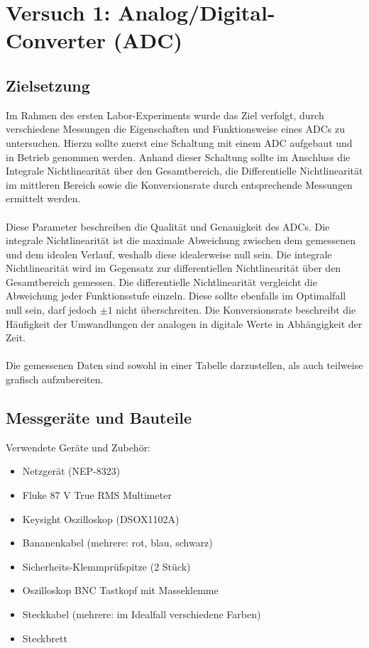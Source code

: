 \documentclass[a4paper,12pt]{article}
\begin{document}
\section{Versuch 1: Analog/Digital-Converter (ADC)}

\subsection{Zielsetzung}
Im Rahmen des ersten Labor-Experiments wurde das Ziel verfolgt, durch verschiedene Messungen die Eigenschaften und Funktionsweise eines ADCs zu untersuchen. Hierzu sollte zuerst eine Schaltung mit einem ADC aufgebaut und in Betrieb genommen werden. Anhand dieser Schaltung sollte im Anschluss die Integrale Nichtlinearität über den Gesamtbereich, die Differentielle Nichtlinearität im mittleren Bereich sowie die Konversionsrate durch entsprechende Messungen ermittelt werden.\\\\Diese Parameter beschreiben die Qualität und Genauigkeit des ADCs. Die integrale Nichtlinearität ist die maximale Abweichung zwischen dem gemessenen und dem idealen Verlauf, weshalb diese idealerweise null sein. Die integrale Nichtlinearität wird im Gegensatz zur differentiellen Nichtlinearität über den Gesamtbereich gemessen. Die differentielle Nichtlinearität vergleicht die Abweichung jeder Funktionsstufe einzeln. Diese sollte ebenfalls im Optimalfall null sein, darf jedoch $\pm1$ nicht überschreiten. Die Konversionsrate beschreibt die Häufigkeit der Umwandlungen der analogen in digitale Werte in Abhängigkeit der Zeit.\\\\
Die gemessenen Daten sind sowohl in einer Tabelle darzustellen, als auch teilweise grafisch aufzubereiten.

\subsection{Messgeräte und Bauteile}
Verwendete Geräte und Zubehör:
\begin{itemize}
\item Netzgerät (NEP-8323)
\item Fluke 87 V True RMS Multimeter
\item Keysight Oszilloskop (DSOX1102A)
\item Bananenkabel (mehrere: rot, blau, schwarz)
\item Sicherheits-Klemmprüfspitze (2 Stück)
\item Oszilloskop BNC Tastkopf mit Masseklemme
\item Steckkabel (mehrere: im Idealfall verschiedene Farben)
\item Steckbrett\\
\end{itemize}
\end{document}
